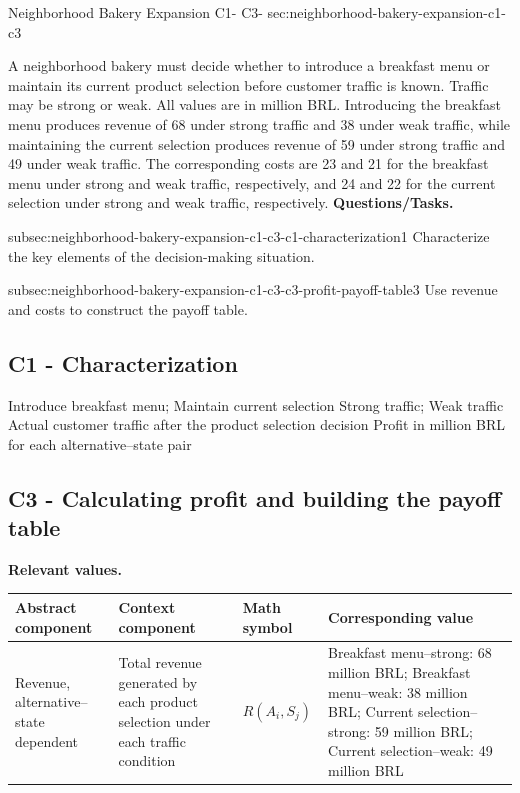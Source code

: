 	\sectionScored
	{Neighborhood Bakery Expansion}
	{C1- \hspace{2mm} C3-}
	{sec:neighborhood-bakery-expansion-c1-c3}
	{
		A neighborhood bakery must decide whether to introduce a breakfast menu or maintain its current product selection before customer traffic is known. Traffic may be strong or weak. All values are in million BRL. Introducing the breakfast menu produces revenue of 68 under strong traffic and 38 under weak traffic, while maintaining the current selection produces revenue of 59 under strong traffic and 49 under weak traffic. The corresponding costs are 23 and 21 for the breakfast menu under strong and weak traffic, respectively, and 24 and 22 for the current selection under strong and weak traffic, respectively.
			\textbf{Questions/Tasks.}
		\begin{enumerate}
			\CriterionTask
			{subsec:neighborhood-bakery-expansion-c1-c3-c1-characterization}{1}
			{Characterize the key elements of the decision-making situation. }
			
			\CriterionTask
			{subsec:neighborhood-bakery-expansion-c1-c3-c3-profit-payoff-table}{3}
			{Use revenue and costs to construct the payoff table. }
		\end{enumerate}
		
		\label{subsec:neighborhood-bakery-expansion-c1-c3-c1-characterization}
		\subsection*{C1 - Characterization }
		
		\DecisionElementsTable
		{Introduce breakfast menu; Maintain current selection}
		{Strong traffic; Weak traffic}
		{Actual customer traffic after the product selection decision}
		{Profit in million BRL for each alternative--state pair}
		
		\label{subsec:neighborhood-bakery-expansion-c1-c3-c3-profit-payoff-table}
		\subsection*{C3 - Calculating profit and building the payoff table }
		
		\textbf{Relevant values.}
		
		\begin{center}
			\small
			\begin{tabularx}{\textwidth}{
					>{\raggedright\arraybackslash}X
					>{\raggedright\arraybackslash}X
					>{\centering\arraybackslash}p{}
					>{\raggedright\arraybackslash}X
				}
				\toprule
				Abstract component & Context component & Math symbol & Corresponding value \\
				\midrule
				Revenue, alternative--state dependent
				&
				Total revenue generated by each product selection under each traffic condition
				&
				$R(A_i,S_j)$
				&
				Breakfast menu--strong: 68 million BRL; Breakfast menu--weak: 38 million BRL; Current selection--strong: 59 million BRL; Current selection--weak: 49 million BRL
				\\
				

\end{tabularx}
\end{center}}
